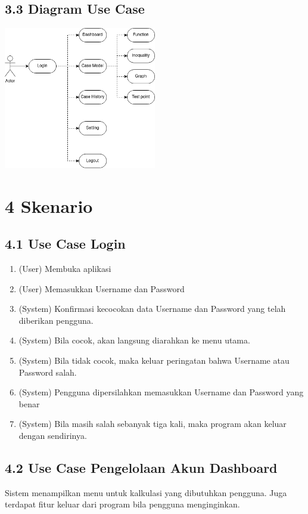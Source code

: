 \documentclass[a4paper]{article}
\begin{document}
    \subsection*{3.3 Diagram Use Case}
    \begin{center}
    \includegraphics[width=0.5\textwidth]{uml-Use Case.drawio.png}
    \end{center}
\section*{4 Skenario}
    \subsection*{4.1 Use Case Login}
    \begin{enumerate}
        \item (User) Membuka aplikasi
        \item (User) Memasukkan Username dan Password
        \item (System) Konfirmasi kecocokan data Username dan Password yang telah diberikan pengguna.
        \item (System) Bila cocok, akan langsung diarahkan ke menu utama.
        \item (System) Bila tidak cocok, maka keluar peringatan bahwa Username atau Password salah.
        \item (System) Pengguna dipersilahkan memasukkan Username dan Password yang benar
        \item (System) Bila masih salah sebanyak tiga kali, maka program akan keluar dengan sendirinya.
    \end{enumerate}
    \subsection*{4.2 Use Case Pengelolaan Akun Dashboard}
    \noindent Sistem menampilkan menu untuk kalkulasi yang dibutuhkan pengguna. 
    Juga terdapat fitur keluar dari program bila pengguna menginginkan.
\end{document}
